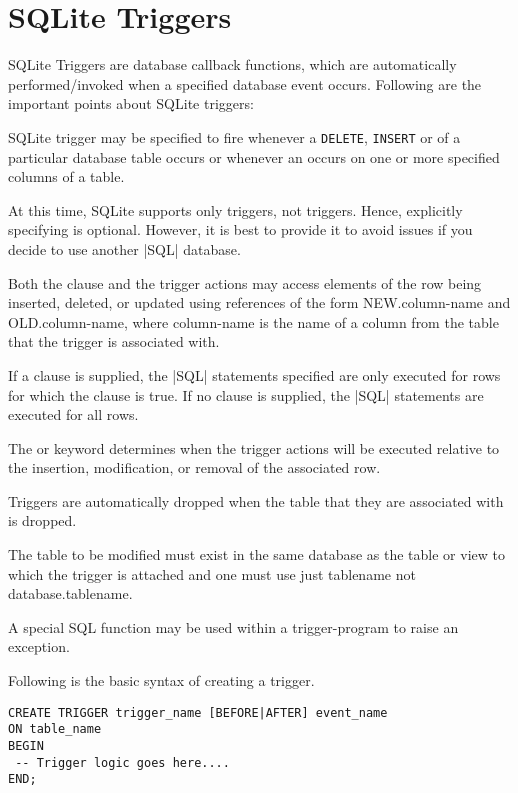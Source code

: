 \chapter{SQLite Triggers}

SQLite Triggers are database callback functions, which are automatically performed/invoked when a specified database event occurs. Following are the important points about SQLite triggers: 

SQLite trigger may be specified to fire whenever a \texttt{DELETE}, \texttt{INSERT} or 
 of a particular database table occurs or whenever an 
 occurs on one or more specified columns of a table.

At this time, SQLite supports only  triggers, not  triggers. Hence, explicitly specifying  is optional. However, it is best to provide it to avoid issues if you decide to use another |SQL| database. 

Both the  clause and the trigger actions may access elements of the row being inserted, deleted, or updated using references of the form NEW.column-name and OLD.column-name, where column-name is the name of a column from the table that the trigger is associated with.

If a  clause is supplied, the |SQL| statements specified are only executed for rows for which the  clause is true. If no  clause is supplied, the |SQL| statements are executed for all rows.

The  or  keyword determines when the trigger actions will be executed relative to the insertion, modification, or removal of the associated row.

Triggers are automatically dropped when the table that they are associated with is dropped.

The table to be modified must exist in the same database as the table or view to which the trigger is attached and one must use just tablename not database.tablename.

A special SQL function  may be used within a trigger-program to raise an exception.


Following is the basic syntax of creating a trigger.

\begin{verbatim}
CREATE TRIGGER trigger_name [BEFORE|AFTER] event_name 
ON table_name
BEGIN
 -- Trigger logic goes here....
END;
\end{verbatim}



